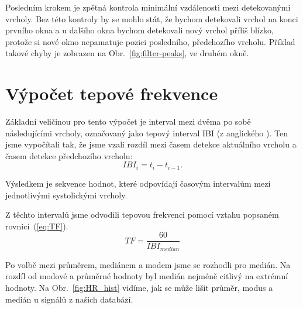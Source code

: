 Posledním krokem je zpětná kontrola minimální vzdálenosti mezi detekovanými vrcholy.
Bez této kontroly by se mohlo stát, že bychom detekovali vrchol na konci prvního okna a u dalšího okna bychom detekovali nový vrchol příliš blízko, protože si nové okno nepamatuje pozici posledního, předchozího vrcholu.
Příklad takové chyby je zobrazen na Obr.~\ref{fig:filter-peaks}, ve druhém okně.

\section{Výpočet tepové frekvence}
\label{sec:alg_hr}
Základní veličinou pro tento výpočet je interval mezi dvěma po sobě následujícími vrcholy, označovaný jako tepový interval \acs{IBI} (z anglického ).
Ten jsme vypočítali tak, že jsme vzali rozdíl mezi časem detekce aktuálního vrcholu a časem detekce předchozího vrcholu:
\begin{equation}
	\label{eq:IBI}
	IBI_{i} = t_{i} - t_{i-1}.
\end{equation}

Výsledkem je sekvence hodnot, které odpovídají časovým intervalům mezi jednotlivými systolickými vrcholy.

Z těchto intervalů jsme odvodili tepovou frekvenci pomocí vztahu popsaném rovnicí~(\ref{eq:TF}).
\begin{equation}
	\label{eq:TF}
	TF = \frac{60}{IBI_{median}}
\end{equation}

Po volbě mezi průměrem, mediánem a modem jsme se rozhodli pro medián.
Na rozdíl od modové a průměrné hodnoty byl medián nejméně citlivý na extrémní hodnoty.
Na Obr.~\ref{fig:HR_hist} vidíme, jak se může lišit průměr, modus a medián u signálů z našich databází.

